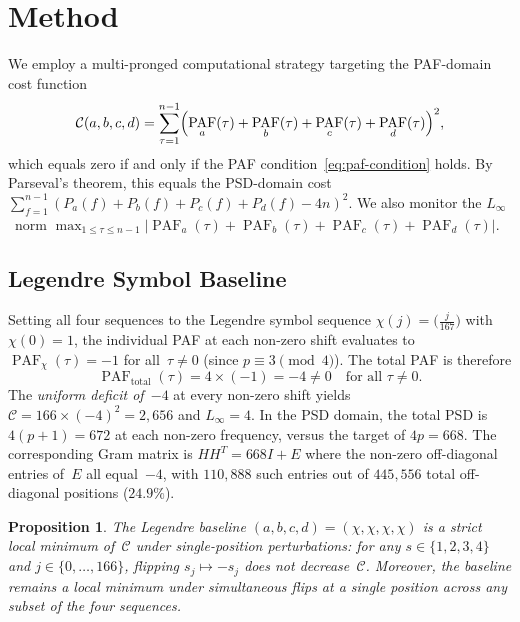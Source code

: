 \documentclass[11pt,a4paper]{article}
\newtheorem{proposition}[theorem]{Proposition}
\newcommand{\Linf}{L_\infty}
\DeclareMathOperator{\PAF}{PAF}
\begin{document}
\section{Method}\label{sec:method}

We employ a multi-pronged computational strategy targeting the PAF-domain
cost function
\begin{equation}\label{eq:cost}
  \mathcal{C}(a,b,c,d) = \sum_{\tau=1}^{n-1}
    \Bigl(\PAF_a(\tau) + \PAF_b(\tau) + \PAF_c(\tau) + \PAF_d(\tau)\Bigr)^2,
\end{equation}
which equals zero if and only if the PAF condition~\eqref{eq:paf-condition}
holds.  By Parseval's theorem, this equals the PSD-domain cost
$\sum_{f=1}^{n-1} (P_a(f) + P_b(f) + P_c(f) + P_d(f) - 4n)^2$.
We also monitor the $\Linf$~norm
$\max_{1 \le \tau \le n-1} |\PAF_a(\tau) + \PAF_b(\tau) + \PAF_c(\tau) +
\PAF_d(\tau)|$.

\subsection{Legendre Symbol Baseline}\label{sec:method:legendre}

Setting all four sequences to the Legendre symbol sequence
$\chi(j) = \bigl(\frac{j}{167}\bigr)$ with $\chi(0) = 1$, the individual
PAF at each non-zero shift evaluates to $\PAF_\chi(\tau) = -1$ for
all~$\tau \neq 0$ (since $p \equiv 3 \pmod{4}$).  The total PAF is
therefore
\begin{equation}\label{eq:legendre-paf}
  \PAF_{\text{total}}(\tau) = 4 \times (-1) = -4 \neq 0
  \quad \text{for all } \tau \neq 0.
\end{equation}
The \emph{uniform deficit of~$-4$} at every non-zero shift yields
$\mathcal{C} = 166 \times (-4)^2 = 2{,}656$ and $\Linf = 4$.  In the
PSD domain, the total PSD is $4(p+1) = 672$ at each non-zero frequency,
versus the target of $4p = 668$.  The corresponding Gram matrix is
$HH^T = 668I + E$ where the non-zero off-diagonal entries of~$E$
all equal~$-4$, with $110{,}888$ such entries out of $445{,}556$ total
off-diagonal positions ($24.9\%$).

\begin{proposition}\label{prop:local-min}
  The Legendre baseline $(a,b,c,d) = (\chi,\chi,\chi,\chi)$ is a strict
  local minimum of~$\mathcal{C}$ under single-position perturbations:
  for any $s \in \{1,2,3,4\}$ and $j \in \{0,\ldots,166\}$, flipping
  $s_j \mapsto -s_j$ does not decrease~$\mathcal{C}$.  Moreover, the
  baseline remains a local minimum under simultaneous flips at a single
  position across any subset of the four sequences.
\end{proposition}
\end{document}
